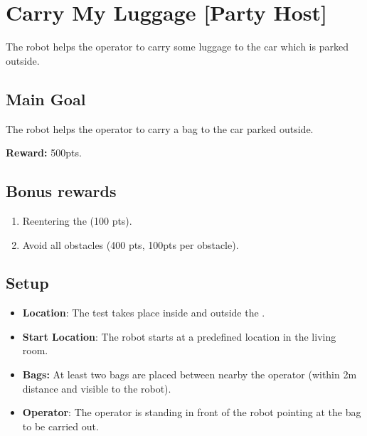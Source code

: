 \section{Carry My Luggage [Party Host]}
\label{test:carry-my-luggage}
The robot helps the operator to carry some luggage to the car which is parked outside.


\subsection*{Main Goal}
The robot helps the operator to carry a bag to the car parked outside.

\noindent\textbf{Reward:} 500pts.

\subsection*{Bonus rewards}
\begin{enumerate}[nosep]
	\item Reentering the \Arena{} (100 pts).
	\item Avoid all obstacles (400 pts, 100pts per obstacle).
\end{enumerate}


\subsection*{Setup}
\begin{itemize}[nosep]
	\item \textbf{Location}: The test takes place inside and outside the \Arena{}.

	\item \textbf{Start Location}: The robot starts at a predefined location in the living room.

	\item \textbf{Bags:} At least two bags are placed between nearby the operator (within 2m distance and visible to the robot).

	\item \textbf{Operator}: The operator is standing in front of the robot pointing at the bag to be carried out.

\end{itemize}

